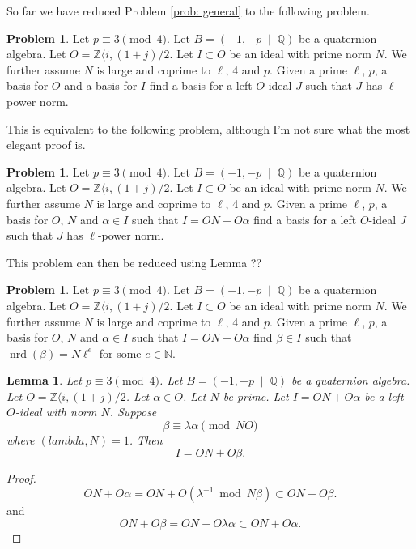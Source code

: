 \documentclass[10pt]{article}
\theoremstyle{plain}
\newtheorem{lemma}[theorem]{Lemma}
\theoremstyle{definition}
\newtheorem{problem}[theorem]{Problem}
\newcommand{\op}{\operatorname}
\newcommand{\N}{\mathbb{N}}
\newcommand{\Z}{\mathbb{Z}}
\newcommand{\Q}{\mathbb{Q}}
\newcommand{\nrd}{\op{nrd}}
\begin{document}
So far we have reduced Problem \ref{prob: general} to the following problem.
\begin{problem} \label{prob: prime norm}
Let \( p \equiv 3 \pmod{4} \).
Let \( B =  (-1, -p \; \mid \; \Q) \) be a quaternion algebra.
Let \( O = \Z \langle i, (1+j) / 2 \).
Let \( I \subset O \) be an ideal with prime norm \( N \).
We further assume \( N \) is large and coprime to \( \ell \), 4 and \( p \).
Given a prime \( \ell \), \( p \), a basis for \( O \) and a basis for \( I \) find a basis for a left \( O \)-ideal \( J \) such that \( J \) has \( \ell \)-power norm.
\end{problem}

This is equivalent to the following problem, although I'm not sure what the most elegant proof is.
\begin{problem} \label{prob: prime norm}
Let \( p \equiv 3 \pmod{4} \).
Let \( B =  (-1, -p \; \mid \; \Q) \) be a quaternion algebra.
Let \( O = \Z \langle i, (1+j) / 2 \).
Let \( I \subset O \) be an ideal with prime norm \( N \).
We further assume \( N \) is large and coprime to \( \ell \), 4 and \( p \).
Given a prime \( \ell \), \( p \), a basis for \( O \), \( N \) and \( \alpha \in I \) such that \( I = ON + O\alpha \) find a basis for a left \( O \)-ideal \( J \) such that \( J \) has \( \ell \)-power norm.
\end{problem}

This problem can then be reduced using Lemma ??

\begin{problem} \label{prob: ell power}
Let \( p \equiv 3 \pmod{4} \).
Let \( B =  (-1, -p \; \mid \; \Q) \) be a quaternion algebra.
Let \( O = \Z \langle i, (1+j) / 2 \).
Let \( I \subset O \) be an ideal with prime norm \( N \).
We further assume \( N \) is large and coprime to \( \ell \), 4 and \( p \).
Given a prime \( \ell \), \( p \), a basis for \( O \), \( N \) and \( \alpha \in I \) such that \( I = ON + O\alpha \) find \( \beta \in I \) such that \( \nrd(\beta) = N\ell^e \) for some \( e \in \N \).
\end{problem}

\begin{lemma}
    Let \( p \equiv 3 \pmod{4} \).
    Let \( B =  (-1, -p \; \mid \; \Q) \) be a quaternion algebra.
    Let \( O = \Z \langle i, (1+j) / 2 \).
    Let \( \alpha \in O \).
    Let \( N \) be prime.
    Let \( I = ON + O\alpha \) be a left \( O \)-ideal with norm \( N \).
    Suppose
    \[
        \beta \equiv \lambda \alpha \pmod{NO}
    \]
    where \( (lambda, N) = 1 \).
    Then
    \[
        I = ON + O\beta .
    \]
\end{lemma}
\begin{proof}
    \[
        ON + O\alpha
        = ON + O(\lambda^{-1} \bmod{N}\beta)
        \subset ON + O\beta .
    \]
    and
    \[
        ON + O\beta
        = ON + O\lambda \alpha
        \subset ON + O\alpha .
    \]
\end{proof}
\end{document}
